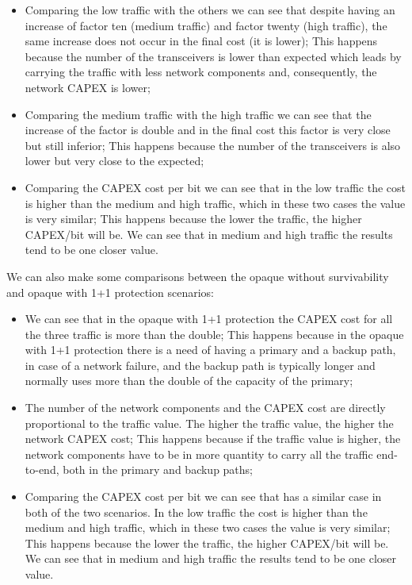 \begin{itemize}
  \item Comparing the low traffic with the others we can see that despite having an increase of factor ten (medium traffic) and factor twenty (high traffic), the same increase does not occur in the final cost (it is lower);
  \subitem This happens because the number of the transceivers is lower than expected which leads by carrying the traffic with less network components and, consequently, the network CAPEX is lower;
  \item Comparing the medium traffic with the high traffic we can see that the increase of the factor is double and in the final cost this factor is very close but still inferior;
  \subitem This happens because the number of the transceivers is also lower but very close to the expected;
  \item Comparing the CAPEX cost per bit we can see that in the low traffic the cost is higher than the medium and high traffic, which in these two cases the value is very similar;
  \subitem This happens because the lower the traffic, the higher CAPEX/bit will be. We can see that in medium and high traffic the results tend to be one closer value.
\end{itemize}

We can also make some comparisons between the opaque without survivability and opaque with 1+1 protection scenarios:

\begin{itemize}
  \item We can see that in the opaque with 1+1 protection the CAPEX cost for all the three traffic is more than the double;
    \subitem This happens because in the opaque with 1+1 protection there is a need of having a primary and a backup path, in case of a network failure, and the backup path is typically longer and normally uses more than the double of the capacity of the primary;
  \item The number of the network components and the CAPEX cost are directly proportional to the traffic value. The higher the traffic value, the higher the network CAPEX cost;
  \subitem This happens because if the traffic value is higher, the network components have to be in more quantity to carry all the traffic end-to-end, both in the primary and backup paths;
  \item Comparing the CAPEX cost per bit we can see that has a similar case in both of the two scenarios. In the low traffic the cost is higher than the medium and high traffic, which in these two cases the value is very similar;
  \subitem This happens because the lower the traffic, the higher CAPEX/bit will be. We can see that in medium and high traffic the results tend to be one closer value.
\end{itemize}

